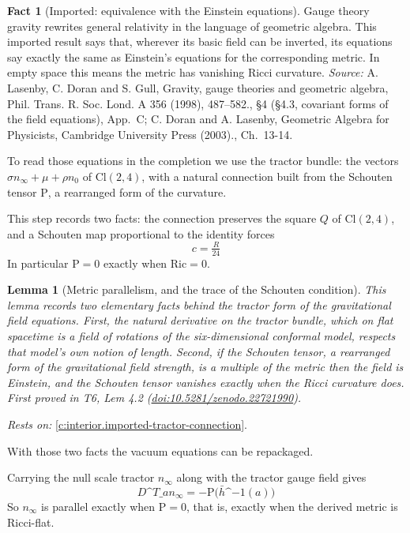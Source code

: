 \documentclass[11pt]{article}
\newtheorem{lemma}[theorem]{Lemma}
\theoremstyle{definition}
\newtheorem{fact}[theorem]{Fact}
\theoremstyle{plain}
\providecommand{\Cl}{}\renewcommand{\Cl}{\mathrm{Cl}}
\providecommand{\Ric}{}\renewcommand{\Ric}{\mathrm{Ric}}
\providecommand{\Sch}{}\renewcommand{\Sch}{\mathrm{P}}
\providecommand{\hb}{}\renewcommand{\hb}{\bar{h}}
\providecommand{\nInf}{}\renewcommand{\nInf}{n_\infty}
\providecommand{\nO}{}\renewcommand{\nO}{n_0}
\begin{document}
\begin{fact}[Imported: equivalence with the Einstein equations]\label{c:interior.imported-equivalence-einstein-equations}
Gauge theory gravity rewrites general relativity in the language of geometric algebra. This imported result says that, wherever its basic field can be inverted, its equations say exactly the same as Einstein's equations for the corresponding metric. In empty space this means the metric has vanishing Ricci curvature.
\emph{Source:} A. Lasenby, C. Doran and S. Gull, Gravity, gauge theories and geometric algebra, Phil. Trans. R. Soc. Lond. A 356 (1998), 487--582., \S 4 (\S 4.3, covariant forms of the field equations), App.~C; C. Doran and A. Lasenby, Geometric Algebra for Physicists, Cambridge University Press (2003)., Ch.~13-14.
\end{fact}

To read those equations in the completion we use the tractor bundle: the vectors $\sigma\nInf + \mu + \rho\nO$ of $\Cl(2,4)$, with a natural connection built from the Schouten tensor $\Sch$, a rearranged form of the curvature.

This step records two facts: the connection preserves the square $Q$ of $\Cl(2,4)$, and a Schouten map proportional to the identity forces \[ c = \tfrac{R}{24} \] In particular $\Sch = 0$ exactly when $\Ric = 0$.

\begin{lemma}[Metric parallelism, and the trace of the Schouten condition]\label{c:interior.metric-parallelism-trace-schouten-condition}
This lemma records two elementary facts behind the tractor form of the gravitational field equations. First, the natural derivative on the tractor bundle, which on flat spacetime is a field of rotations of the six-dimensional conformal model, respects that model's own notion of length. Second, if the Schouten tensor, a rearranged form of the gravitational field strength, is a multiple of the metric then the field is Einstein, and the Schouten tensor vanishes exactly when the Ricci curvature does.
\emph{First proved in} T6, Lem 4.2 (\href{https://doi.org/10.5281/zenodo.22721990}{doi:10.5281/zenodo.22721990}).
\end{lemma}
\noindent\emph{Rests on:} \ref{c:interior.imported-tractor-connection}.

With those two facts the vacuum equations can be repackaged.

Carrying the null scale tractor $\nInf$ along with the tractor gauge field gives \[ D\^{}{T}\_{a}\nInf = -\Sch\bigl(\hb\^{}{-1}(a)\bigr) \] So $\nInf$ is parallel exactly when $\Sch = 0$, that is, exactly when the derived metric is Ricci-flat.
\end{document}

